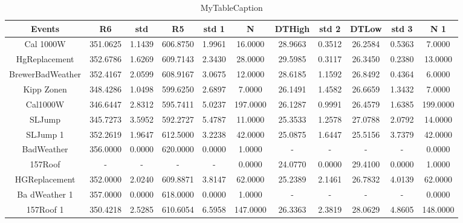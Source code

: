 \begin{table}
\begin{tabular}{|c|c|c|c|c|c|c|c|c|c|c|}
\hline
 Events & R6 & std & R5 & std 1 & N & DTHigh & std 2 & DTLow & std 3 & N 1 \\
\hline
 Cal 1000W  & 351.0625 & 1.1439 & 606.8750 & 1.9961 & 16.0000 & 28.9663 & 0.3512 & 26.2584 & 0.5363 & 7.0000 \\
\hline
 HgReplacement  & 352.6786 & 1.6269 & 609.7143 & 2.3430 & 28.0000 & 29.5985 & 0.3117 & 26.3450 & 0.2380 & 13.0000 \\
\hline
 BrewerBadWeather  & 352.4167 & 2.0599 & 608.9167 & 3.0675 & 12.0000 & 28.6185 & 1.1592 & 26.8492 & 0.4364 & 6.0000 \\
\hline
 Kipp Zonen  & 348.4286 & 1.0498 & 599.6250 & 2.6897 & 7.0000 & 26.1491 & 1.4582 & 26.6659 & 1.3432 & 7.0000 \\
\hline
 Cal1000W  & 346.6447 & 2.8312 & 595.7411 & 5.0237 & 197.0000 & 26.1287 & 0.9991 & 26.4579 & 1.6385 & 199.0000 \\
\hline
 SLJump  & 345.7273 & 3.5952 & 592.2727 & 5.4787 & 11.0000 & 25.3533 & 1.2578 & 27.0788 & 2.0792 & 14.0000 \\
\hline
 SLJump  1 & 352.2619 & 1.9647 & 612.5000 & 3.2238 & 42.0000 & 25.0875 & 1.6447 & 25.5156 & 3.7379 & 42.0000 \\
\hline
 BadWeather  & 356.0000 & 0.0000 & 620.0000 & 0.0000 & 1.0000 & - & - & - & - & 0.0000 \\
\hline
 157Roof  & - & - & - & - & 0.0000 & 24.0770 & 0.0000 & 29.4100 & 0.0000 & 1.0000 \\
\hline
 HGReplacement  & 352.0000 & 2.0240 & 609.8871 & 3.8147 & 62.0000 & 25.2389 & 2.1461 & 26.7832 & 4.0139 & 62.0000 \\
\hline
 Ba dWeather  1 & 357.0000 & 0.0000 & 618.0000 & 0.0000 & 1.0000 & - & - & - & - & 0.0000 \\
\hline
 157Roof  1 & 350.4218 & 2.5285 & 610.6054 & 6.5958 & 147.0000 & 26.3363 & 2.3819 & 28.0629 & 4.8605 & 148.0000 \\
\hline
\end{tabular}
\caption{MyTableCaption}
\label{table:MyTableLabel}
\end{table}
